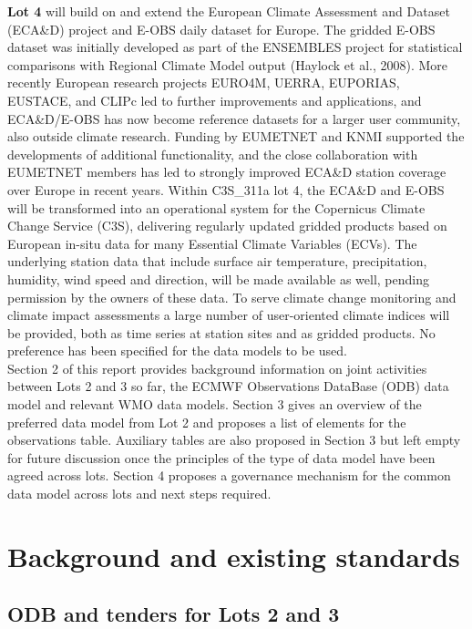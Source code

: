 \documentclass[a4paper]{article}
\begin{document}
\textbf{Lot 4} will build on and extend the European Climate Assessment and Dataset (ECA\&D) project and E-OBS daily dataset for Europe. The gridded E-OBS dataset was initially developed as part of the ENSEMBLES project for statistical comparisons with Regional Climate Model output (Haylock et al., 2008). More recently European research projects EURO4M, UERRA, EUPORIAS, EUSTACE, and CLIPc led to further improvements and applications, and ECA\&D/E-OBS has now become reference datasets for a larger user community, also outside climate research. Funding by EUMETNET and KNMI supported the developments of additional functionality, and the close collaboration with EUMETNET members has led to strongly improved ECA\&D station coverage over Europe in recent years. Within C3S\_311a lot 4, the ECA\&D and E-OBS will be transformed into an operational system for the Copernicus Climate Change Service (C3S), delivering regularly updated gridded products based on European in-situ data for many Essential Climate Variables (ECVs). The underlying station data that include surface air temperature, precipitation, humidity, wind speed and direction, will be made available as well, pending permission by the owners of these data. To serve climate change monitoring and climate impact assessments a large number of user-oriented climate indices will be provided, both as time series at station sites and as gridded products. No preference has been specified for the data models to be used.\\


Section 2 of this report provides background information on joint activities between Lots 2 and 3 so far, the ECMWF Observations DataBase (ODB) data model and relevant WMO data models. Section 3 gives an overview of the preferred data model from Lot 2 and proposes a list of elements for the observations table. Auxiliary tables are also proposed in Section 3 but left empty for future discussion once the principles of the type of data model have been agreed across lots. Section 4 proposes a governance mechanism for the common data model across lots and next steps required.\\


\section {Background and existing standards}
\subsection {ODB and tenders for Lots 2 and 3}
\end{document}
